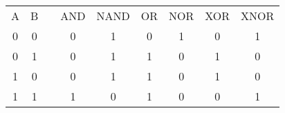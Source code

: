 \renewcommand{\arraystretch}{1.3}
\setlength{\oldtabcolsep}{\tabcolsep}\setlength\tabcolsep{3pt}
\begin{center}
    \begin{tabularx}{0.78\linewidth}{@{}ccccccccc@{}}
        A & B && AND & NAND & OR & NOR & XOR & XNOR \\
        \cmidrule{1-2}\cmidrule{4-9}
        0 & 0 && 0   & 1    & 0  & 1   & 0   & 1    \\
        0 & 1 && 0   & 1    & 1  & 0   & 1   & 0    \\
        1 & 0 && 0   & 1    & 1  & 0   & 1   & 0    \\
        1 & 1 && 1   & 0    & 1  & 0   & 0   & 1    \\
    \end{tabularx}
\end{center}

\renewcommand{\arraystretch}{1}
\setlength{\tabcolsep}{\oldtabcolsep}

